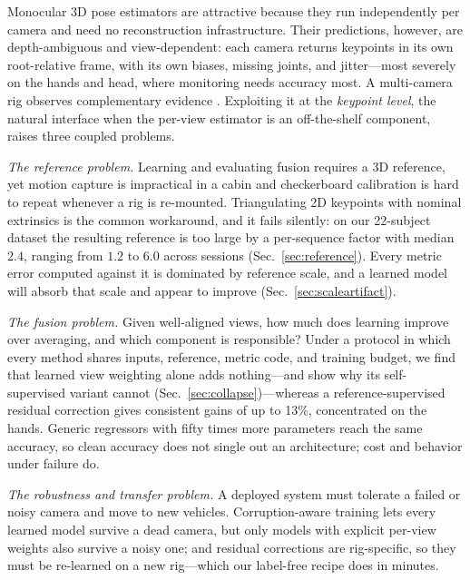 \documentclass[journal]{IEEEtran}
\begin{document}
Monocular 3D pose estimators \cite{toshev2014deeppose,martinez2017simple,mehta2017vnect,kanazawa2018end} are attractive because they run independently per camera and need no reconstruction infrastructure. Their predictions, however, are depth-ambiguous and view-dependent: each camera returns keypoints in its own root-relative frame, with its own biases, missing joints, and jitter---most severely on the hands and head, where monitoring needs accuracy most. A multi-camera rig observes complementary evidence \cite{iskakov2019learnable,qiu2019cross,tu2020voxelpose}. Exploiting it at the \emph{keypoint level}, the natural interface when the per-view estimator is an off-the-shelf component, raises three coupled problems.

\emph{The reference problem.} Learning and evaluating fusion requires a 3D reference, yet motion capture is impractical in a cabin and checkerboard calibration is hard to repeat whenever a rig is re-mounted. Triangulating 2D keypoints with nominal extrinsics is the common workaround, and it fails silently: on our 22-subject dataset the resulting reference is too large by a per-sequence factor with median $2.4$, ranging from $1.2$ to $6.0$ across sessions (Sec.~\ref{sec:reference}). Every metric error computed against it is dominated by reference scale, and a learned model will absorb that scale and appear to improve (Sec.~\ref{sec:scaleartifact}).

\emph{The fusion problem.} Given well-aligned views, how much does learning improve over averaging, and which component is responsible? Under a protocol in which every method shares inputs, reference, metric code, and training budget, we find that learned view weighting alone adds nothing---and show why its self-supervised variant cannot (Sec.~\ref{sec:collapse})---whereas a reference-supervised residual correction gives consistent gains of up to 13\%, concentrated on the hands. Generic regressors with fifty times more parameters reach the same accuracy, so clean accuracy does not single out an architecture; cost and behavior under failure do.

\emph{The robustness and transfer problem.} A deployed system must tolerate a failed or noisy camera and move to new vehicles. Corruption-aware training lets every learned model survive a dead camera, but only models with explicit per-view weights also survive a noisy one; and residual corrections are rig-specific, so they must be re-learned on a new rig---which our label-free recipe does in minutes.
\end{document}
